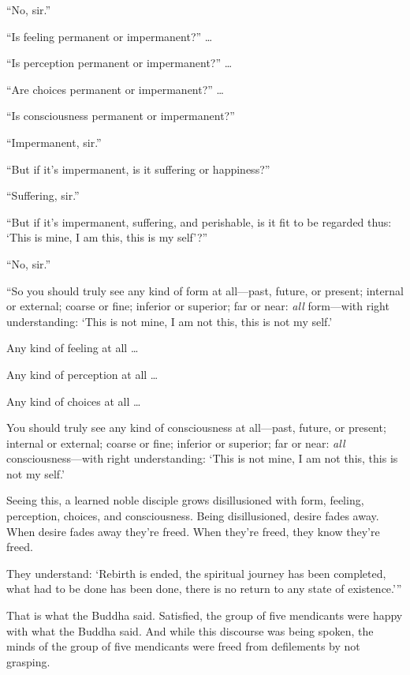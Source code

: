 \documentclass[12pt,openany]{book}%
\begin{document}
“No, sir.” 

“Is feeling permanent or impermanent?” … 

“Is perception permanent or impermanent?” … 

“Are choices permanent or impermanent?” … 

“Is consciousness permanent or impermanent?” 

“Impermanent, sir.” 

“But if it’s impermanent, is it suffering or happiness?” 

“Suffering, sir.” 

“But if it’s impermanent, suffering, and perishable, is it fit to be regarded thus: ‘This is mine, I am this, this is my self’?” 

“No, sir.” 

“So you should truly see any kind of form at all—past, future, or present; internal or external; coarse or fine; inferior or superior; far or near: \emph{all} form—with right understanding: ‘This is not mine, I am not this, this is not my self.’ 

Any kind of feeling at all … 

Any kind of perception at all … 

Any kind of choices at all … 

You should truly see any kind of consciousness at all—past, future, or present; internal or external; coarse or fine; inferior or superior; far or near: \emph{all} consciousness—with right understanding: ‘This is not mine, I am not this, this is not my self.’ 

Seeing this, a learned noble disciple grows disillusioned with form, feeling, perception, choices, and consciousness. Being disillusioned, desire fades away. When desire fades away they’re freed. When they’re freed, they know they’re freed. 

They understand: ‘Rebirth is ended, the spiritual journey has been completed, what had to be done has been done, there is no return to any state of existence.’” 

That is what the Buddha said. Satisfied, the group of five mendicants were happy with what the Buddha said. And while this discourse was being spoken, the minds of the group of five mendicants were freed from defilements by not grasping. 
\end{document}
